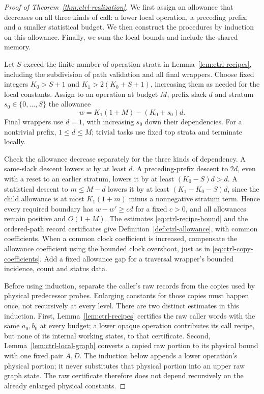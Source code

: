 \begin{proof}[Proof of Theorem~\ref{thm:ctrl-realization}]
We first assign an allowance that decreases on all three kinds of call: a lower local operation, a preceding prefix, and a smaller statistical budget. We then construct the procedures by induction on this allowance. Finally, we sum the local bounds and include the shared memory.

Let $S$ exceed the finite number of operation strata in
Lemma~\ref{lem:ctrl-recipes}, including the subdivision of path
validation and all final wrappers.  Choose fixed integers
$K_0>S+1$ and $K_1>2(K_0+S+1)$, increasing them as needed for the
local constants.  Assign to an operation at budget $M$, prefix slack
$d$ and stratum $s_0\in\{0,\ldots,S\}$ the allowance
\begin{equation}\label{eq:ctrl-allowance-formula}
 w=K_1(1+M)-(K_0+s_0)d.
\end{equation}
Final wrappers use $d=1$, with increasing $s_0$ down their dependencies.
For a nontrivial prefix, $1\le d\le M$; trivial tasks use fixed top
strata and terminate locally.

Check the allowance decrease separately for the three kinds of dependency. A same-slack descent lowers $w$ by at least $d$.  A preceding-prefix
descent to $2d$, even with a reset to an earlier stratum, lowers it by
at least $(K_0-S)d>d$.  A statistical descent to $m\le M-d$ lowers it
by at least $(K_1-K_0-S)d$, since the child allowance is at most
$K_1(1+m)$ minus a nonnegative stratum term.  Hence every required
boundary has $w-w'\ge c d$ for a fixed $c>0$, and all allowances remain
positive and $O(1+M)$.  The estimates
\eqref{eq:ctrl-recipe-bound} and the ordered-path record certificates
give Definition~\ref{def:ctrl-allowance}, with common coefficients.
When a common clock coefficient is increased, compensate the allowance
coefficient using the bounded clock overshoot, just as in
\eqref{eq:ctrl-copy-coefficients}.  Add a fixed allowance gap for a
traversal wrapper's bounded incidence, count and status data.

Before using induction, separate the caller's raw records from the copies used by physical predecessor probes. Enlarging constants for those copies must happen once, not recursively at every level. There are two distinct estimates in this induction.  First,
Lemma~\ref{lem:ctrl-recipes} certifies the raw caller words with the same
$a_0,b_0$ at every budget; a lower opaque operation contributes its call
recipe, but none of its internal working states, to that certificate.
Second, Lemma~\ref{lem:ctrl-local-graph} converts a copied raw portion to
its physical bound with one fixed pair $A,D$.  The induction below
appends a lower operation's physical portion; it never substitutes that
physical portion into an upper raw graph state.  The raw certificate
therefore does not depend recursively on the already enlarged physical
constants.


\end{proof}
